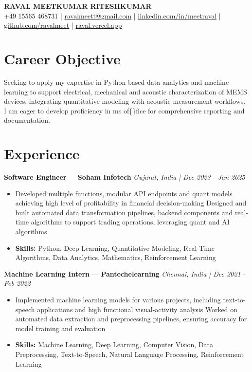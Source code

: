 \documentclass[a4paper,10pt]{article}
\begin{document}
\begin{center}
  {\Large\bfseries RAVAL MEETKUMAR RITESHKUMAR}\\[2pt]
  {\small +49 15565 468731 \;|\; \href{mailto:ravalmeett@gmail.com}{ravalmeett@gmail.com} \;|\; \href{https://www.linkedin.com/in/meetraval/}{linkedin.com/in/meetraval} \;|\; \href{https://github.com/ravalmeet}{github.com/ravalmeet} \;|\; \href{https://raval.vercel.app/}{raval.vercel.app}}
\end{center}
\vspace{-3pt}

\section*{Career Objective}
Seeking to apply my expertise in Python-based data analytics and machine learning to support electrical, mechanical and acoustic characterization of MEMS devices, integrating quantitative modeling with acoustic measurement workflows. I am eager to develop proficiency in ms of\{\}fice for comprehensive reporting and documentation.\par

\section*{Experience}
\textbf{Software Engineer} — \textbf{Soham Infotech} \hfill \textit{Gujarat, India \;|\; Dec 2023 - Jan 2025}\par
\vspace{1pt}
\begin{itemize}
  \item Developed multiple functions, modular API endpoints and quant models achieving high level of profitability in financial decision-making Designed and built automated data transformation pipelines, backend components and real-time algorithms to support trading operations, leveraging quant and AI algorithms
  \item \textbf{Skills:} Python, Deep Learning, Quantitative Modeling, Real-Time Algorithms, Data Analytics, Mathematics, Reinforcement Learning
\end{itemize}
\vspace{3pt}
\textbf{Machine Learning Intern} — \textbf{Pantechelearning} \hfill \textit{Chennai, India \;|\; Dec 2021 - Feb 2022}\par
\vspace{1pt}
\begin{itemize}
  \item Implemented machine learning models for various projects, including text-to-speech applications and high functional visual-activity analysis Worked on automated data extraction and preprocessing pipelines, ensuring accuracy for model training and evaluation
  \item \textbf{Skills:} Machine Learning, Deep Learning, Computer Vision, Data Preprocessing, Text-to-Speech, Natural Language Processing, Reinforcement Learning
\end{itemize}
\end{document}
